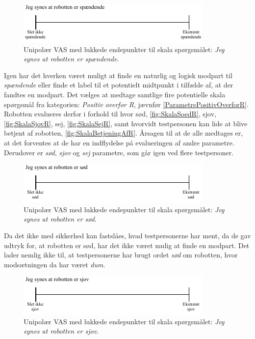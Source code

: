 %
\begin{figure}[H]
\centering
\includegraphics[width =\textwidth]{Figure/UdvalgteSkalaer/RerSpaendende} 
\caption{Unipolær VAS med lukkede endepunkter til skala spørgsmålet: \textit{Jeg synes at robotten er spændende}.}
\label{fig:SkalaRerSpaendende}
\end{figure}
\noindent
%
Igen har det hverken været muligt at finde en naturlig og logisk modpart til \textit{spændende} eller finde et label til et potentielt midtpunkt i tilfælde af, at der fandtes en modpart.\blankline 
%
Det vælges at medtage samtlige fire potentielle skala spørgsmål fra kategorien: \textit{Positiv overfor R}, jævnfør \autoref{ParametrePositivOverforR}. Robotten evalueres derfor i forhold til hvor sød, \autoref{fig:SkalaSoedR}, sjov, \autoref{fig:SkalaSjovR}, sej, \autoref{fig:SkalaSejR}, samt hvorvidt testpersonen kan lide at blive betjent af robotten, \autoref{fig:SkalaBetjeningAfR}. Årsagen til at de alle medtages er, at det forventes at de har en indflydelse på evalueringen af andre parametre. Derudover er \textit{sød}, \textit{sjov} og \textit{sej} parametre, som går igen ved flere testpersoner. 
%
\begin{figure}[H]
\centering
\includegraphics[width =\textwidth]{Figure/UdvalgteSkalaer/SoedR} 
\caption{Unipolær VAS med lukkede endepunkter til skala spørgsmålet: \textit{Jeg synes at robotten er sød}.}
\label{fig:SkalaSoedR}
\end{figure}
\noindent
%
Da det ikke med sikkerhed kan fastslåes, hvad testpersonerne har ment, da de gav udtryk for, at robotten er sød, har det ikke været mulig at finde en modpart. Det lader nemlig ikke til, at testpersonerne har brugt ordet \textit{sød} om robotten, hvor modsætningen da har været \textit{dum}.   
%
\begin{figure}[H]
\centering
\includegraphics[width =\textwidth]{Figure/UdvalgteSkalaer/SjovR} 
\caption{Unipolær VAS med lukkede endepunkter til skala spørgsmålet: \textit{Jeg synes at robotten er sjov}.}
\label{fig:SkalaSjovR}
\end{figure}
